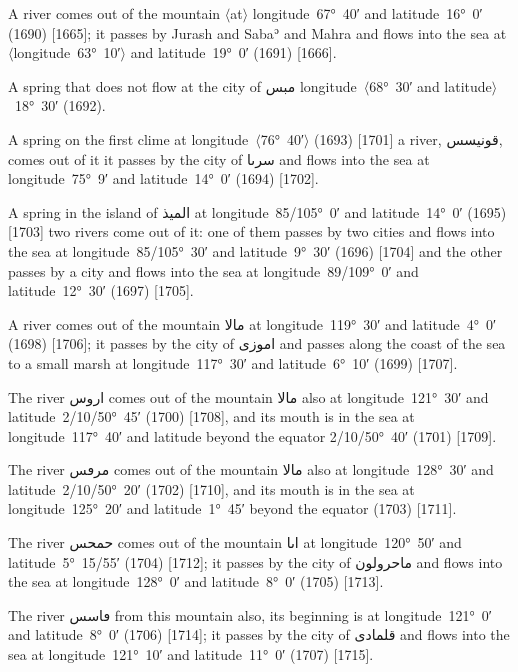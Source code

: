 \documentclass[11pt]{article}
\newcommand{\Pg}[1]{\marginpar{\footnotesize #1}}
\newcommand{\Ang}[1]{\ensuremath{#1}}
\begin{document}
A river comes out of the mountain \Ang{\langle}at\Ang{\rangle} longitude~67°~40′ and latitude~16°~0′ (1690) [1665]; it passes by Jurash and Sabaʾ and Mahra and flows into the sea at \Ang{\langle}longitude~63°~10′\Ang{\rangle} and latitude~19°~0′ (1691) [1666].

A spring that does not flow at the city of \textarabic{مبس} longitude~\Ang{\langle}68°~30′ and latitude\Ang{\rangle}~18°~30′ (1692).

A spring on the first clime at longitude~\Ang{\langle}76°~40′\Ang{\rangle} (1693) [1701] a river, \textarabic{قونيسس}, comes out of it it passes by the city of \textarabic{سرٮا} and flows into the sea at longitude~75°~9′ and latitude~14°~0′ (1694) [1702].

A spring in the island of \textarabic{الميذ} at longitude~85/105°~0′ and latitude~14°~0′ (1695) [1703] two rivers come out of it: one of them passes by two cities and flows into the sea at longitude~85/105°~30′ and latitude~9°~30′ (1696) [1704] and the other passes by a city and flows into the sea at longitude~89/109°~0′ and latitude~12°~30′ (1697) [1705].

A river comes out of the mountain \textarabic{مالا} at longitude~119°~30′ and latitude~4°~0′ (1698) [1706]; it passes by the city of \textarabic{اموزى} and passes along the coast of the sea to a small marsh at longitude~117°~30′ and latitude~6°~10′ (1699) [1707].

The river \textarabic{اروس} comes out of the mountain \textarabic{مالا} also at longitude~121°~30′ and latitude~2/10/50°~45′ (1700) [1708], and its mouth is in the sea at longitude~117°~40′ and latitude beyond the equator 2/10/50°~40′ (1701) [1709]\Pg{p. 113}.

The river \textarabic{مرڡس} comes out of the mountain \textarabic{مالا} also at longitude~128°~30′ and latitude~2/10/50°~20′ (1702) [1710], and its mouth is in the sea at longitude~125°~20′ and latitude~1°~45′ beyond the equator (1703) [1711].

The river \textarabic{حمحس} comes out of the mountain \textarabic{اٮا} at longitude~120°~50′ and latitude~5°~15/55′ (1704) [1712]; it passes by the city of \textarabic{ماحرولون} and flows into the sea at longitude~128°~0′ and latitude~8°~0′ (1705) [1713].

The river \textarabic{ڡاسس} from this mountain also, its beginning is at longitude~121°~0′ and latitude~8°~0′ (1706) [1714]; it passes by the city of \textarabic{قلمادى} and flows into the sea at longitude~121°~10′ and latitude~11°~0′ (1707) [1715].
\end{document}
